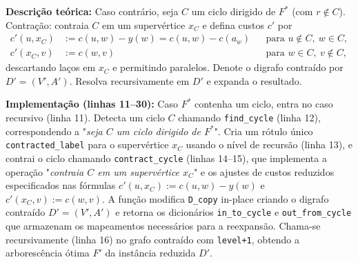 \begin{tcolorbox}[
        enhanced, breakable,
        colframe=green!60!black, colback=green!5,
        colbacktitle=green!20, coltitle=black,
        title={Passo 3: Contração, recursão e reexpansão},
        boxed title style={sharp corners, boxrule=0.6pt},
        sharp corners, boxrule=0.6pt
    ]
    \textbf{Descrição teórica:} Caso contrário, seja \(C\) um ciclo dirigido de \(F^*\) (com \(r\notin C\)). Contração: contraia \(C\) em um supervértice \(x_C\) e defina custos \(c'\) por
    \begin{align*}
        c'(u,x_C) & := c(u,w) - y(w) = c(u,w) - c(a_w) &  & \text{para } u\notin C,\ w\in C, \\
        c'(x_C,v) & := c(w,v)                          &  & \text{para } w\in C,\ v\notin C,
    \end{align*}
    descartando laços em \(x_C\) e permitindo paralelos. Denote o digrafo contraído por \(D'=(V',A')\). Resolva recursivamente em \(D'\) e expanda o resultado.

    \tcblower

    \textbf{Implementação (linhas 11--30):} Caso \(F^*\) contenha um ciclo, entra no caso recursivo (linha 11). Detecta um ciclo \(C\) chamando \texttt{find\_cycle} (linha 12), correspondendo a "\emph{seja \(C\) um ciclo dirigido de \(F^*\)}". Cria um rótulo único \texttt{contracted\_label} para o supervértice \(x_C\) usando o nível de recursão (linha 13), e contrai o ciclo chamando \texttt{contract\_cycle} (linhas 14--15), que implementa a operação "\emph{contraia \(C\) em um supervértice \(x_C\)}" e os ajustes de custos reduzidos especificados nas fórmulas \(c'(u,x_C) := c(u,w) - y(w)\) e \(c'(x_C,v) := c(w,v)\). A função modifica \texttt{D\_copy} in-place criando o digrafo contraído \(D'=(V',A')\) e retorna os dicionários \texttt{in\_to\_cycle} e \texttt{out\_from\_cycle} que armazenam os mapeamentos necessários para a reexpansão. Chama-se recursivamente (linha 16) no grafo contraído com \texttt{level+1}, obtendo a arborescência ótima \(F'\) da instância reduzida \(D'\).


\end{tcolorbox}
